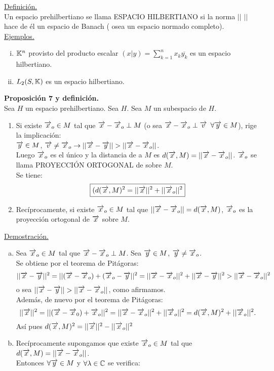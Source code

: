 \underline{Definición.}\\
Un espacio prehilbertiano se llama ESPACIO HILBERTIANO si la norma $||$ $||$ hace de él un espacio de Banach ( osea un espacio normado completo).\\
\underline{Ejemplos.}
\begin{enumerate}[i)]
\item $\mathbb{K}^n$ provisto del producto escalar $(x|y)=\sum_{k=1}^{n}x_k\overline{y_k}$ es un espacio hilbertiano.
\item $L_2(S,\mathbb{K})$ es un espacio hilbertiano.
\end{enumerate}
\textbf{Proposición 7 y definición.} \\
Sea $H$ un espacio prehilbertiano. Sea \x\en $H$. Sea $M$ un subespacio de $H$. 
\begin{enumerate}[1)]
\item Si existe $\overrightarrow{x}_o \in M$ tal que $\overrightarrow{x}-\overrightarrow{x}_o \perp M$ (o sea $\overrightarrow{x} - \overrightarrow{x}_o \perp \overrightarrow{v}$ $\forall \overrightarrow{y} \in M$), rige la implicación: \\
$\overrightarrow{y} \in M$, $\overrightarrow{v} \neq \overrightarrow{x}_o \rightarrow  || \overrightarrow{x} -\overrightarrow{y} || > || \overrightarrow{x} -\overrightarrow{x}_o ||$.  \\
Luego $\overrightarrow{x}_o$ es el único y la distancia de \xraya \phantom{} a $M$ es $d(\overrightarrow{x} , M)= || \overrightarrow{x} - \overrightarrow{x}_o ||$. $\overrightarrow{x}_o$ se llama PROYECCIÓN ORTOGONAL de \xraya \phantom{} sobre $M$. \\
Se tiene:
\begin{equation*}
\boxed{(d(\overrightarrow{x},M)^2=|| \overrightarrow{x} ||^2+||\overrightarrow{x}_o ||^2}
\end{equation*}
\item Recíprocamente, si existe $\overrightarrow{x}_o \in M$ tal que $|| \overrightarrow{x}-\overrightarrow{x}_o||=d(\overrightarrow{x},M)$, $\overrightarrow{x}_o$ es la proyección ortogonal de $\overrightarrow{x}$ sobre $M$. \\
\end{enumerate}
\underline{Demostración.}\\
\begin{enumerate}[a)]
\item Sea $\overrightarrow{x}_o \in M$ tal que $\overrightarrow{x}-\overrightarrow{x}_o \perp M$. Sea $\overrightarrow{y} \in M$, $\overrightarrow{y} \neq \overrightarrow{x}_o$. \\
Se obtiene por el teorema de Pitágoras:
$$
|| \overrightarrow{x} -\overrightarrow{y}||^2=|| (\overrightarrow{x} -\overrightarrow{x}_o) +(\overrightarrow{x}_o-\overrightarrow{y}||^2=|| \overrightarrow{x} -\overrightarrow{x}_o||^2+|| \overrightarrow{x} -\overrightarrow{y}||^2>|| \overrightarrow{x} - \overrightarrow{x}_o||^2
$$
o sea $|| \overrightarrow{x} -\overrightarrow{y} || > || \overrightarrow{x} - \overrightarrow{x}_o ||$, como afirmamos. \\
Además, de nuevo por el teorema de Pitágoras:
$$
|| \overrightarrow{x}||^2=|| (\overrightarrow{x}-\overrightarrow{x}_0)+\overrightarrow{x}_o||^2=|| \overrightarrow{x}-\overrightarrow{x}_o||^2+|| \overrightarrow{x}_o||^2=d(\overrightarrow{x},M)^2+|| \overrightarrow{x}_o||^2.
$$
Así pues $d(\overrightarrow{x},M)^2=|| \overrightarrow{x}||^2-|| \overrightarrow{x}_o||^2$
\item  Recíprocamente supongamos que existe $\overrightarrow{x}_o \in M$ tal que $d(\overrightarrow{x},M)=|| \overrightarrow{x}-\overrightarrow{x}_o ||$. \\
Entonces $\forall \overrightarrow{y} \in M$ y $\forall \lambda \in \mathbb{C}$ se verifica:
\end{enumerate}
